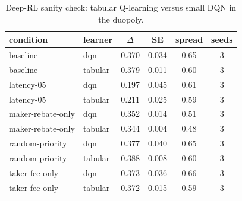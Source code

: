 \begin{table}[t]
\caption{Deep-RL sanity check: tabular Q-learning versus small DQN in the duopoly.}
\label{tab:deep-sanity}
\small
\begin{tabular}{@{}llcccc@{}}
\toprule
condition & learner & $\Delta$ & SE & spread & seeds \\
\midrule
baseline & dqn & 0.370 & 0.034 & 0.65 & 3 \\
baseline & tabular & 0.379 & 0.011 & 0.60 & 3 \\
latency-05 & dqn & 0.197 & 0.045 & 0.61 & 3 \\
latency-05 & tabular & 0.211 & 0.025 & 0.59 & 3 \\
maker-rebate-only & dqn & 0.352 & 0.014 & 0.51 & 3 \\
maker-rebate-only & tabular & 0.344 & 0.004 & 0.48 & 3 \\
random-priority & dqn & 0.377 & 0.040 & 0.65 & 3 \\
random-priority & tabular & 0.388 & 0.008 & 0.60 & 3 \\
taker-fee-only & dqn & 0.373 & 0.036 & 0.66 & 3 \\
taker-fee-only & tabular & 0.372 & 0.015 & 0.59 & 3 \\
\bottomrule
\end{tabular}
\end{table}
